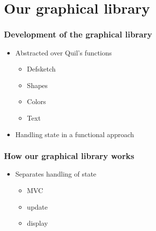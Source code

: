 \documentclass{beamer}
\begin{document}
\section{Our graphical library}

\begin{frame}
\frametitle{Development of the graphical library}
\begin{itemize}
\item Abstracted over Quil's functions
	\begin{itemize}
	\item Defsketch
	\item Shapes
	\item Colors
	\item Text
	\end{itemize}
\item Handling state in a functional approach
\end{itemize}
\end{frame}


\begin{frame}
\frametitle{How our graphical library works}
\begin{itemize}
\item Separates handling of state
	\begin{itemize}
	\item MVC
	\item update
	\item display
	\end{itemize}
\end{itemize}
\end{frame}
\end{document}
